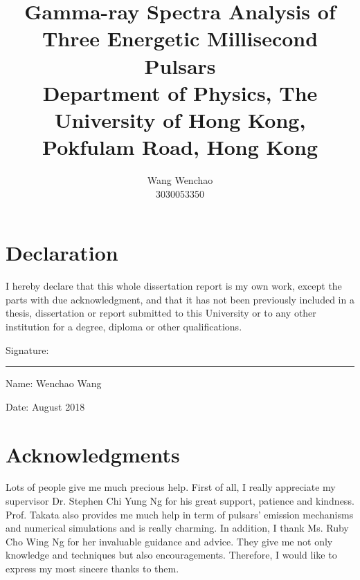 \documentclass[12pt]{report}
\title{\textbf{Gamma-ray Spectra Analysis of Three Energetic Millisecond Pulsars} \\ \vspace{1cm}
  {\large Department of Physics, The University of Hong Kong, Pokfulam Road, Hong Kong}}
\date{}
\author{Wang Wenchao  \\3030053350}
\begin{document}
\linespread{1.25} 
\maketitle



\cleardoublepage
{}
\chapter*{Declaration}
  \doublespacing 
  I hereby declare that this whole dissertation report is my own work, except the parts with due
  acknowledgment, and that it has not been previously included in a thesis, dissertation or
  report submitted to this University or to any other institution for a degree, diploma or other
  qualifications. \\ \vspace{3cm}

  \hspace{7cm} Signature: \rule{3cm}{0.4pt} 

  \hspace*{7.5cm} Name:  Wenchao Wang 

  \hspace*{7.6cm} Date:  August 2018 

\cleardoublepage
{}
\chapter*{Acknowledgments}
  \doublespacing
  Lots of people give me much precious help. First of all, I really appreciate my 
  supervisor Dr. Stephen Chi Yung Ng for his great support, patience and kindness. Prof. Takata 
  also provides me much help in term of pulsars' emission mechanisms and numerical simulations and 
  is really charming. In addition, I thank Ms. Ruby Cho Wing Ng for her invaluable guidance and 
  advice. They give me not only knowledge and techniques but also encouragements. Therefore, I 
  would like to express my most sincere thanks to them.  

\cleardoublepage
{}
\end{document}
